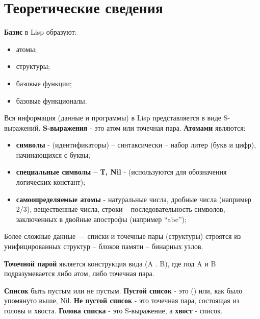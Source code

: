 \chapter{Теоретические сведения}

\textbf{Базис} в Lisp образуют:
\begin{itemize}
    \item атомы;
    \item структуры;
    \item базовые функции;
    \item базовые функционалы.
\end{itemize}

Вся информация (данные и программы) в Lisp представляется в виде S-выражений. \textbf{S-выражения} - это атом или точечная пара.
\textbf{Атомами} являются:
\begin{itemize}
    \item \textbf{символы} -  (идентификаторы) –  синтаксически – набор литер (букв и цифр), начинающихся с буквы;
    \item \textbf{специальные символы – {Т, Nil}} - (используются для обозначения логических констант);
    \item \textbf{самоопределяемые атомы} - натуральные числа, дробные числа (например 2/3), вещественные числа, строки – последовательность символов, заключенных в двойные апострофы (например “abc”);
\end{itemize}

Более сложные данные — списки и точечные пары (структуры) строятся из унифицированных структур – блоков памяти – бинарных узлов.

\textbf{Точечной парой} является конструкция вида (A . B), где под A и B подразумевается либо атом, либо точечная пара.

\textbf{Список} быть пустым или не пустым. \textbf{Пустой список} - это () или, как было упомянуто выше, Nil. \textbf{Не пустой список} - это точечная пара, состоящая из головы и хвоста. \textbf{Голова списка} - это S-выражение, а \textbf{хвост} - список.

